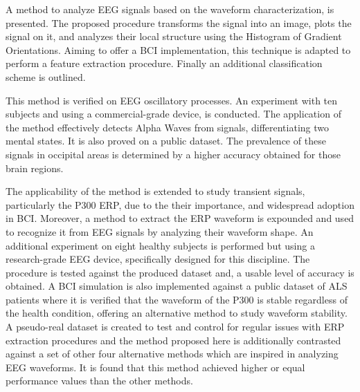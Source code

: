 A method to analyze EEG signals based on the waveform characterization, is presented. The proposed procedure transforms the signal into an image, plots the signal on it, and analyzes their local structure using the Histogram of Gradient Orientations.   Aiming to offer a BCI implementation, this technique is adapted to perform a feature extraction procedure.  Finally an additional classification scheme is outlined.

This method is verified on EEG oscillatory processes.  An experiment with ten subjects and using a commercial-grade device, is conducted.  The application of the method effectively detects Alpha Waves from signals, differentiating two mental states.  It is also proved on a public dataset.  The prevalence of these signals in occipital areas is determined by a higher accuracy obtained for those brain regions.

The applicability of the method is extended to study transient signals, particularly the P300 ERP,  due to the their importance, and widespread adoption in BCI.  Moreover, a method to  extract the ERP waveform is expounded and used to recognize it from EEG signals by analyzing their waveform shape.  An additional experiment on eight healthy subjects is performed but using a research-grade EEG device, specifically designed for this discipline.  The procedure is tested against the produced dataset and, a usable level of accuracy is obtained.  A BCI simulation is also implemented against a public dataset of ALS patients where it is verified that the waveform of the P300 is stable regardless of the health condition, offering an alternative method to study waveform stability.  A pseudo-real dataset is created to test and control for regular issues with ERP extraction procedures and the method proposed here is additionally contrasted against a set of other four alternative methods which are inspired in analyzing EEG waveforms.  It is found that this method achieved higher or equal performance values than the other methods.



